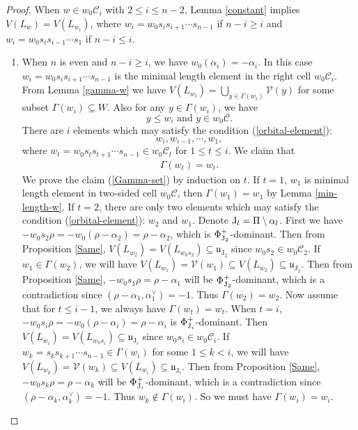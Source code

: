 \documentclass[11pt, reqno]{amsart}
\newcommand{\fru}{\mathfrak{u}}
\renewcommand{\subset}{\subseteq}
\theoremstyle{definition}
\numberwithin{equation}{section}
\begin{document}
\begin{proof}
 When $w \in w_0\mathcal{C}_i$ with $2\leq i\leq n-2$, Lemma \ref{constant} implies $V(L_w) = V(L_{w_i})$, where  $w_i=w_0s_is_{i+1}\cdots s_{n-1}$ if $n-i\geq i$ and $w_i=w_0s_is_{i-1}\cdots s_{1}$ if $n-i\leq i$.
 \begin{enumerate}
     \item When $n$ is even  and $n-i\geq i$, we have $w_0(\alpha_i)=-\alpha_i$. In this case $w_i=w_0s_is_{i+1}\cdots s_{n-1}$ is the minimal length element in the right cell $w_0\mathcal{C}_i$. From Lemma \ref{gamma-w} we have $V(L_{w_i})=\bigcup\limits_{y\in \Gamma(w_i)}\mathcal{V}(y)$ for some subset $\Gamma(w_i)\subset W$.  Also  for any $y\in \Gamma(w_i)$, we have  
     \begin{equation}\label{orbital-element}
    y\leq w_i \text{~and~} y\in w_0\mathcal{C}.
     \end{equation}
There are $i$ elements which may satisfy the condition (\ref{orbital-element}): $$w_i,w_{i-1},\cdots, w_1,$$ where $w_t=w_0s_ts_{t+1}\cdots s_{n-1}\in w_0\mathcal{C}_t$ for $1\leq t\leq i$. We claim that 
     \begin{align}\label{Gamma-set}
         \Gamma(w_t)=w_t.
     \end{align}
We prove the claim (\ref{Gamma-set}) by induction on $t$. If $t=1$, $w_1$ is minimal length element in two-sided cell $w_0\mathcal{C}$, then $ \Gamma(w_1)=w_1$ by Lemma \ref{min-length-w}. If $t=2$, there are only two elements which may satisfy the condition (\ref{orbital-element}): $w_2$ and $w_1$. Denote ${\rm J}_l=\Pi\setminus {\alpha_l}$. First we have $-w_0s_2\rho=-w_0(\rho-\alpha_2)=\rho-\alpha_2$, which is $\Phi_{{\rm J}_{2}}^+$-dominant. Then from Proposition \ref{Same}, $V(L_{w_2})=V(L_{w_0s_2})\subset \fru_{\operatorname{J}_2}$ since $w_0s_2\in w_0\mathcal{C}_2$. If $w_1\in\Gamma(w_2)$, we will have $V(L_{w_1})=\mathcal{V}(w_1)\subset V(L_{w_2})\subset \fru_{\operatorname{J}_2}$. Then from Proposition \ref{Same}, $-w_0s_1\rho=\rho-\alpha_1$ will be  $\Phi_{{\rm J}_2}^+$-dominant, which is a contradiction since $(\rho-\alpha_1,\alpha^{\vee}_1)=-1$. Thus $\Gamma(w_2)=w_2$. Now assume that for $t\leq i-1$, we always have $\Gamma(w_{t})=w_{t}$. When $t=i$, $-w_0s_i\rho=-w_0(\rho-\alpha_i)=\rho-\alpha_{i}$ is $\Phi_{{\rm J}_{i}}^+$-dominant. Then $V(L_{w_i})=V(L_{w_0s_i})\subset \fru_{\operatorname{J}_i}$ since $w_0s_i\in w_0\mathcal{C}_i$. If $w_k=s_ks_{k+1}\cdots s_{n-1}\in\Gamma(w_i)$ for some $1\leq k<i$, we will have $V(L_{w_k})=\mathcal{V}(w_k)\subset V(L_{w_i})\subset\fru_{\operatorname{J}_i}$. Then from Proposition \ref{Same}, $-w_0s_k\rho=\rho-\alpha_k$ will be  $\Phi_{{\rm J}_i}^+$-dominant, which is a contradiction since $(\rho-\alpha_k,\alpha^{\vee}_k)=-1$. Thus $w_k\notin \Gamma(w_i)$. So we must have $\Gamma(w_i)=w_i$.


\end{enumerate}
\end{proof}
\end{document}
